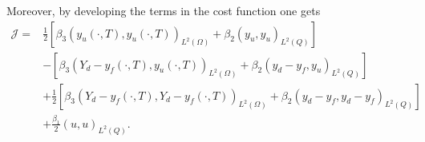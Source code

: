 \documentclass[12pt,a4paper]{article}
\theoremstyle{plain}
\theoremstyle{definition}
\begin{document}
Moreover, by developing the terms in the cost function one gets
%
\begin{equation*}
\begin{split}
\mathcal{J} = & \frac{1}{2} \left[ \beta_3 \left( y_u \left( \cdot, T \right), y_u \left( \cdot, T \right) \right)_{L^2\left(\Omega\right)} + \beta_2 \left( y_u, y_u \right)_{L^2\left( Q \right)} \right] \\
& - \left[  \beta_3 \left( Y_d - y_f \left( \cdot, T \right), y_u \left( \cdot, T \right) \right)_{L^2\left(\Omega\right)} + \beta_2 \left(y_d - y_f, y_u \right)_{L^2\left( Q \right)} \right] \\
&  + \frac{1}{2} \left[ \beta_3 \left( Y_d - y_f \left( \cdot, T \right), Y_d - y_f \left( \cdot, T \right) \right)_{L^2\left(\Omega\right)} + \beta_2 \left( y_d - y_f, y_d - y_f \right)_{L^2\left( Q \right)} \right] \\
& + \frac{\beta_1}{2} \left( u, u \right)_{L^2\left( Q \right)}.
\end{split}
\end{equation*}
\iffalse
\begin{equation*}
\begin{split}
\mathcal{J} = & \frac{\beta_1}{2} \left( u, u \right)_{L^2\left(Q \right)} + \frac{\beta_2}{2} \left( y_u, y_u \right)_{L^2\left(Q\right)} - \beta_2 \left(y_d - y_f, y_u \right)_{L^2\left(Q \right)} + \\ & \frac{\beta_2}{2} \left( y_d - y_f, y_d - y_f \right)_{L^2\left( Q \right)} + \frac{\beta_3}{2} \left( y_u \left( \cdot, T \right), y_u \left( \cdot, T \right) \right)_{L^2\left(\Omega\right)} - \\ & \beta_3 \left( Y_d - y_f \left( \cdot, T \right), y_u \left( \cdot, T \right) \right)_{L^2\left(\Omega\right)} + \frac{\beta_3}{2} \left( Y_d - y_f \left( \cdot, T \right), Y_d - y_f \left( \cdot, T \right) \right)_{L^2\left(\Omega\right)} = \\
= & \frac{1}{2} \left[ \beta_3 \left( y_u \left( \cdot, T \right), y_u \left( \cdot, T \right) \right)_{L^2\left(\Omega\right)} + \beta_2 \left( y_u, y_u \right)_{L^2\left( Q \right)} \right] - \\
& \left[  \beta_3 \left( Y_d - y_f \left( \cdot, T \right), y_u \left( \cdot, T \right) \right)_{L^2\left(\Omega\right)} + \beta_2 \left(y_d - y_f, y_u \right)_{L^2\left( Q \right)} \right] + \\
& \frac{1}{2} \left[ \beta_3 \left( Y_d - y_f \left( \cdot, T \right), Y_d - y_f \left( \cdot, T \right) \right)_{L^2\left(\Omega\right)} + \beta_2 \left( y_d - y_f, y_d - y_f \right)_{L^2\left( Q \right)} \right] + \\
& \frac{\beta_1}{2} \left( u, u \right)_{L^2\left( Q \right)}.
\end{split}
\end{equation*}
\fi
\end{document}
